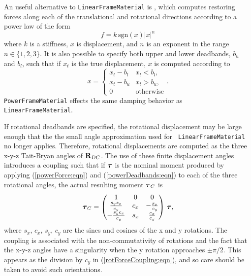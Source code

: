 An useful alternative to {\tt LinearFrameMaterial} 
is , which computes restoring forces along
each of the translational and rotational directions according to a power law of
the form
%
\begin{equation}
f = k \, \text{sgn} (x) |x|^n
\label{powerForce:eqn}
\end{equation}
%
where $k$ is a stiffness, $x$ is displacement, and $n$ is an exponent
in the range $n \in \{1,2,3\}$. It is also possible to specify both upper and
lower deadbands, $b_u$ and $b_l$, such that if $x_t$ is the true
displacement, $x$ is computed according to
%
\begin{equation}
x = \begin{cases}
x_t - b_l & x_t < b_l, \\
x_t - b_u & x_t > b_u, \\
0 & \text{otherwise} 
\end{cases}.
\label{powerDeadbands:eqn}
\end{equation}
%
{\tt PowerFrameMaterial} effects the same damping behavior as {\tt
LinearFrameMaterial}.

If rotational deadbands are specified, the rotational displacement may be large
enough that the the small angle approximation used for {\tt
LinearFrameMaterial} no longer applies. Therefore, rotational displacements are
computed as the three x-y-z Tait-Bryan angles of ${\bf R}_{DC}$.  The use of
these finite displacement angles introduces a coupling such that if $\boldsymbol\tau$ is
the nominal moment produced by applying (\ref{powerForce:eqn}) and
(\ref{powerDeadbands:eqn}) to each of the
three rotational angles, the actual resulting moment $\boldsymbol\tau_C$ is
%
\begin{equation}
\boldsymbol\tau_C = \left(\begin{matrix}
1 & 0 & 0 \\
\frac{s_y s_x}{c_y} & c_x & -\frac{s_x}{c_y} \\
-\frac{s_y c_x}{c_y} & s_x & \frac{c_x}{c_y}
\end{matrix}\right)
\,
\boldsymbol\tau,
\label{rotForceCoupling:eqn}
\end{equation}
%
where $s_x$, $c_x$, $s_y$, $c_y$ are the sines and cosines of the x and y
rotations. The coupling is associated with the non-commutativity of rotations and
the fact that the x-y-z angles have a singularity when the y rotation
approaches $\pm \pi/2$. This appears as the division by $c_y$ in
(\ref{rotForceCoupling:eqn}), and so care should be taken to avoid such
orientations.

